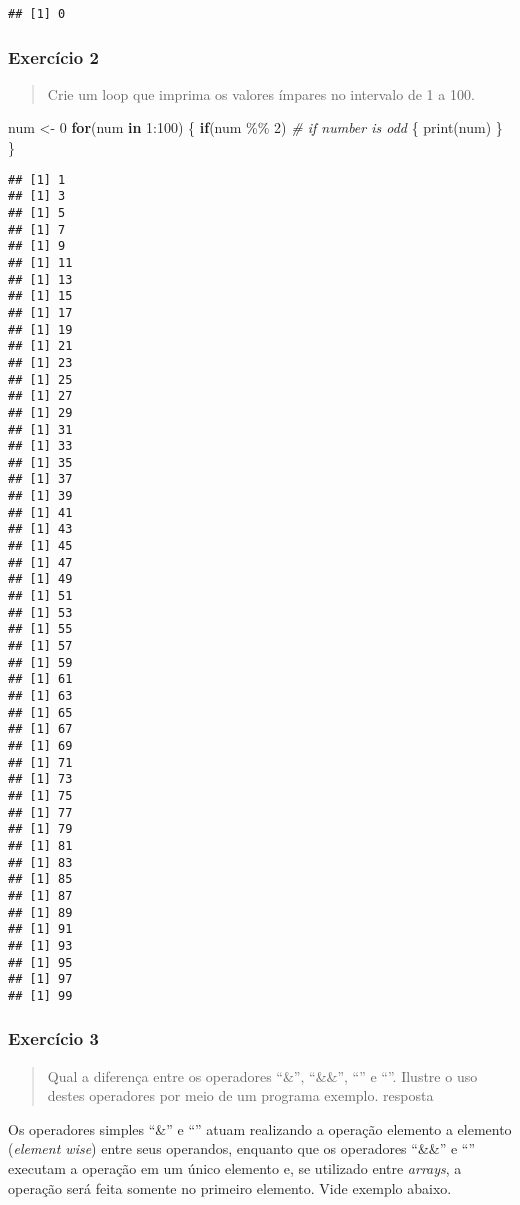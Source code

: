 \documentclass[
]{article}
\newenvironment{Shaded}{\begin{snugshade}}{\end{snugshade}}
\newcommand{\CommentTok}[1]{\textcolor[rgb]{0.56,0.35,0.01}{\textit{#1}}}
\newcommand{\ControlFlowTok}[1]{\textcolor[rgb]{0.13,0.29,0.53}{\textbf{#1}}}
\newcommand{\DecValTok}[1]{\textcolor[rgb]{0.00,0.00,0.81}{#1}}
\newcommand{\FunctionTok}[1]{\textcolor[rgb]{0.00,0.00,0.00}{#1}}
\newcommand{\NormalTok}[1]{#1}
\newcommand{\OtherTok}[1]{\textcolor[rgb]{0.56,0.35,0.01}{#1}}
\newcommand{\SpecialCharTok}[1]{\textcolor[rgb]{0.00,0.00,0.00}{#1}}
\begin{document}
\begin{verbatim}
## [1] 0
\end{verbatim}

\hypertarget{exercuxedcio-2}{%
\subsubsection{Exercício 2}\label{exercuxedcio-2}}

\begin{quote}
Crie um loop que imprima os valores ímpares no intervalo de 1 a 100.
\end{quote}

\begin{Shaded}
\begin{Highlighting}[]
\NormalTok{num }\OtherTok{\textless{}{-}} \DecValTok{0}
\ControlFlowTok{for}\NormalTok{(num }\ControlFlowTok{in} \DecValTok{1}\SpecialCharTok{:}\DecValTok{100}\NormalTok{)}
\NormalTok{\{}
  \ControlFlowTok{if}\NormalTok{(num }\SpecialCharTok{\%\%} \DecValTok{2}\NormalTok{) }\CommentTok{\# if number is odd}
\NormalTok{  \{}
    \FunctionTok{print}\NormalTok{(num)}
\NormalTok{  \}}
\NormalTok{\}}
\end{Highlighting}
\end{Shaded}

\begin{verbatim}
## [1] 1
## [1] 3
## [1] 5
## [1] 7
## [1] 9
## [1] 11
## [1] 13
## [1] 15
## [1] 17
## [1] 19
## [1] 21
## [1] 23
## [1] 25
## [1] 27
## [1] 29
## [1] 31
## [1] 33
## [1] 35
## [1] 37
## [1] 39
## [1] 41
## [1] 43
## [1] 45
## [1] 47
## [1] 49
## [1] 51
## [1] 53
## [1] 55
## [1] 57
## [1] 59
## [1] 61
## [1] 63
## [1] 65
## [1] 67
## [1] 69
## [1] 71
## [1] 73
## [1] 75
## [1] 77
## [1] 79
## [1] 81
## [1] 83
## [1] 85
## [1] 87
## [1] 89
## [1] 91
## [1] 93
## [1] 95
## [1] 97
## [1] 99
\end{verbatim}

\hypertarget{exercuxedcio-3}{%
\subsubsection{Exercício 3}\label{exercuxedcio-3}}

\begin{quote}
Qual a diferença entre os operadores ``\&'', ``\&\&'', ``\textbar{}'' e
``\textbar\textbar{}''. Ilustre o uso destes operadores por meio de um
programa exemplo. resposta
\end{quote}

Os operadores simples ``\&'' e ``\textbar{}'' atuam realizando a
operação elemento a elemento (\emph{element wise}) entre seus operandos,
enquanto que os operadores ``\&\&'' e ``\textbar\textbar{}'' executam a
operação em um único elemento e, se utilizado entre \emph{arrays}, a
operação será feita somente no primeiro elemento. Vide exemplo abaixo.
\end{document}
